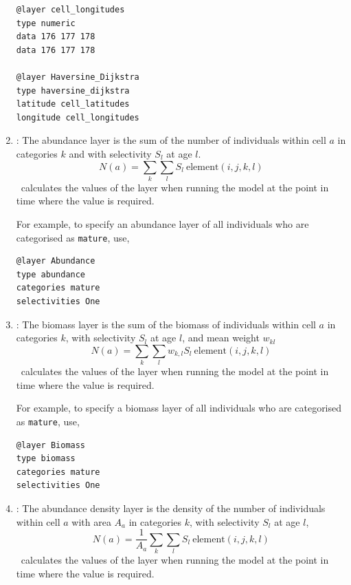 \begin{enumerate}
{{\begin{verbatim}
@layer cell_longitudes
type numeric
data 176 177 178
data 176 177 178

@layer Haversine_Dijkstra
type haversine_dijkstra
latitude cell_latitudes
longitude cell_longitudes
\end{verbatim}}}

\item{}: The abundance layer is the sum of the number of individuals within cell $a$ in categories $k$ and with selectivity $S_l$ at age $l$. 
\begin{equation}
  N(a) = \sum\limits_{k} \sum\limits_l S_l \ \text{element}(i,j,k,l)
\end{equation}
\SPM\ calculates the values of the layer when running the model at the point in time where the value is required.

For example, to specify an abundance layer of all individuals who are categorised as \texttt{mature}, use,
{\small{\begin{verbatim}
@layer Abundance
type abundance
categories mature
selectivities One
\end{verbatim}}}

\item {}: The biomass layer is the sum of the biomass of individuals within cell $a$ in categories $k$, with selectivity $S_l$ at age $l$, and mean weight $w_{kl}$
\begin{equation}
  N(a) = \sum\limits_{k} \sum\limits_l w_{k,l} S_l \ \text{element}(i,j,k,l) 
\end{equation}
\SPM\ calculates the values of the layer when running the model at the point in time where the value is required.

For example, to specify a biomass layer of all individuals who are categorised as \texttt{mature}, use,
{\small{\begin{verbatim}
@layer Biomass
type biomass
categories mature
selectivities One
\end{verbatim}}}

\item {}: The abundance density layer is the density of the number of individuals within cell $a$ with area $A_a$ in categories $k$, with selectivity $S_l$ at age $l$,
\begin{equation}
  N(a) = \frac{1}{A_a} \sum\limits_{k} \sum\limits_l S_l \ \text{element}(i,j,k,l)
\end{equation}
\SPM\ calculates the values of the layer when running the model at the point in time where the value is required.


\end{enumerate}
